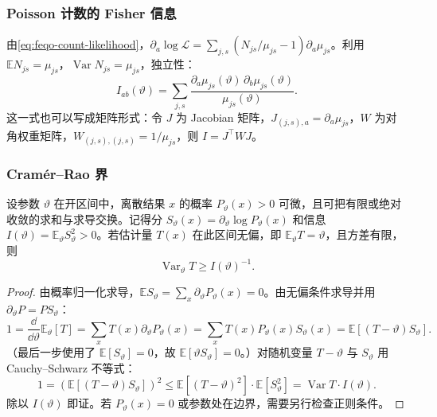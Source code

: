 \subsubsection{Poisson 计数的 Fisher 信息}

由\cref{eq:feqo-count-likelihood}，$\partial_a\log\mathcal{L}=\sum_{j,s}(N_{js}/\mu_{js}-1)\partial_a\mu_{js}$。利用 $\mathbb{E}N_{js}=\mu_{js}$，$\operatorname{Var}N_{js}=\mu_{js}$，独立性：
\begin{equation}
I_{ab}(\vartheta)=\sum_{j,s}\frac{\partial_a\mu_{js}(\vartheta)\,\partial_b\mu_{js}(\vartheta)}{\mu_{js}(\vartheta)}.
\label{eq:feqo-poisson-fisher}
\end{equation}
这一式也可以写成矩阵形式：令 $J$ 为 Jacobian 矩阵，$J_{(j,s),a}=\partial_a\mu_{js}$，$W$ 为对角权重矩阵，$W_{(j,s),(j,s)}=1/\mu_{js}$，则 $I=J^\top W J$。

\subsubsection{Cram\'er--Rao 界}

\begin{proposition}
\label{prop:cramer-rao}
设参数 $\vartheta$ 在开区间中，离散结果 $x$ 的概率 $P_\vartheta(x)>0$ 可微，且可把有限或绝对收敛的求和与求导交换。记得分 $S_\vartheta(x)=\partial_\vartheta\log P_\vartheta(x)$ 和信息 $I(\vartheta)=\mathbb{E}_\vartheta S_\vartheta^2>0$。若估计量 $T(x)$ 在此区间无偏，即 $\mathbb{E}_\vartheta T=\vartheta$，且方差有限，则
\begin{equation}
\operatorname{Var}_\vartheta T\geq I(\vartheta)^{-1}.
\label{eq:feqo-cr-bound}
\end{equation}
\end{proposition}
\begin{proof}
由概率归一化求导，$\mathbb{E}S_\vartheta=\sum_x\partial_\vartheta P_\vartheta(x)=0$。由无偏条件求导并用 $\partial_\vartheta P=P S_\vartheta$：
\begin{equation}
1=\frac{\dd}{\dd\vartheta}\mathbb{E}_\vartheta[T]=\sum_x T(x)\partial_\vartheta P_\vartheta(x)=\sum_x T(x)P_\vartheta(x)S_\vartheta(x)=\mathbb{E}[(T-\vartheta)S_\vartheta].
\end{equation}
（最后一步使用了 $\mathbb{E}[S_\vartheta]=0$，故 $\mathbb{E}[\vartheta S_\vartheta]=0$。）对随机变量 $T-\vartheta$ 与 $S_\vartheta$ 用 Cauchy--Schwarz 不等式：
\begin{equation}
1=(\mathbb{E}[(T-\vartheta)S_\vartheta])^2\leq\mathbb{E}[(T-\vartheta)^2]\cdot\mathbb{E}[S_\vartheta^2]=\operatorname{Var}T\cdot I(\vartheta).
\end{equation}
除以 $I(\vartheta)$ 即证。若 $P_\vartheta(x)=0$ 或参数处在边界，需要另行检查正则条件。
\end{proof}

